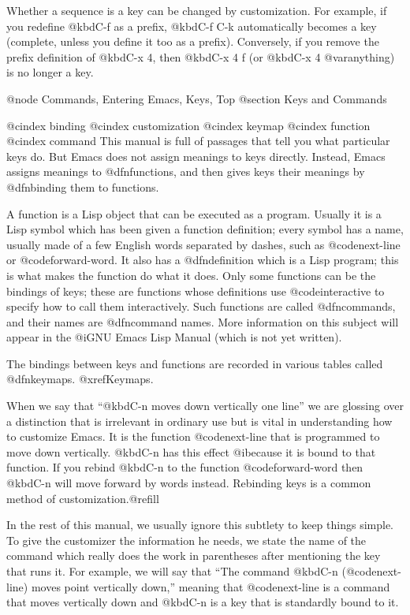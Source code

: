 {{  Whether a sequence is a key can be changed by customization.  For
example, if you redefine @kbd{C-f} as a prefix, @kbd{C-f C-k} automatically
becomes a key (complete, unless you define it too as a prefix).
Conversely, if you remove the prefix definition of @kbd{C-x 4}, then
@kbd{C-x 4 f} (or @kbd{C-x 4 @var{anything}}) is no longer a key.

@node Commands, Entering Emacs, Keys, Top
@section Keys and Commands

@cindex binding
@cindex customization
@cindex keymap
@cindex function
@cindex command
  This manual is full of passages that tell you what particular keys do.
But Emacs does not assign meanings to keys directly.  Instead, Emacs
assigns meanings to @dfn{functions}, and then gives keys their meanings by
@dfn{binding} them to functions. 

  A function is a Lisp object that can be executed as a program.  Usually
it is a Lisp symbol which has been given a function definition; every
symbol has a name, usually made of a few English words separated by dashes,
such as @code{next-line} or @code{forward-word}.  It also has a
@dfn{definition} which is a Lisp program; this is what makes the function
do what it does.  Only some functions can be the bindings of keys; these
are functions whose definitions use @code{interactive} to specify how to
call them interactively.  Such functions are called @dfn{commands}, and
their names are @dfn{command names}.  More information on this subject will
appear in the @i{GNU Emacs Lisp Manual} (which is not yet written).

  The bindings between keys and functions are recorded in various tables
called @dfn{keymaps}.  @xref{Keymaps}.

  When we say that ``@kbd{C-n} moves down vertically one line'' we are
glossing over a distinction that is irrelevant in ordinary use but is vital
in understanding how to customize Emacs.  It is the function
@code{next-line} that is programmed to move down vertically.  @kbd{C-n} has
this effect @i{because} it is bound to that function.  If you rebind
@kbd{C-n} to the function @code{forward-word} then @kbd{C-n} will move
forward by words instead.  Rebinding keys is a common method of
customization.@refill

  In the rest of this manual, we usually ignore this subtlety to keep
things simple.  To give the customizer the information he needs, we
state the name of the command which really does the work in parentheses
after mentioning the key that runs it.  For example, we will say that
``The command @kbd{C-n} (@code{next-line}) moves point vertically down,''
meaning that @code{next-line} is a command that moves vertically down
and @kbd{C-n} is a key that is standardly bound to it.

}}
